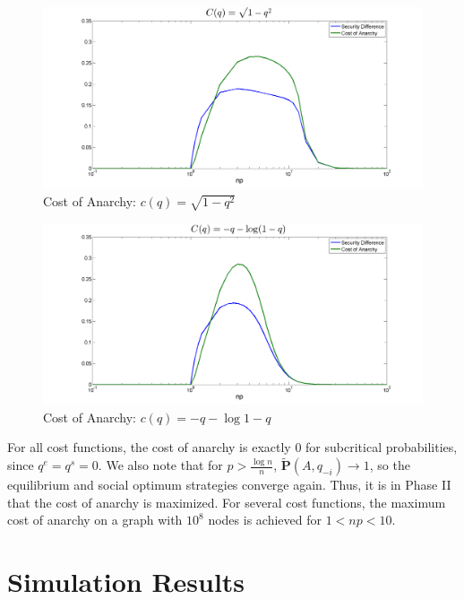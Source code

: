 \documentclass{article}
\theoremstyle{plain}
\begin{document}
\begin{figure}[h!]
  \centering
  \includegraphics[width=6in]{cost_of_anarchy_sqrt(1-q^2).png}
  \caption{Cost of Anarchy: $c(q) = \sqrt{1-q^2}$}
  \label{cost_of_anarchy_sqrt(1-q^2).fig}
\end{figure}

\begin{figure}[h!]
  \centering
  \includegraphics[width=6in]{cost_of_anarchy_-q-log(1-q).png}
  \caption{Cost of Anarchy: $c(q) = -q - \log{1-q}$}
  \label{cost_of_anarchy_-q-log(1-q).fig}
\end{figure}

For all cost functions, the cost of anarchy is exactly $0$ for subcritical probabilities, since $q^e = q^s = 0$. We also note that for $p > \frac{\log{n}}{n}$,  $\tilde{\textbf{P}}(A,q_{-i}) \rightarrow 1$, so the equilibrium and social optimum strategies converge again. Thus, it is in Phase II that the cost of anarchy is maximized. For several cost functions, the maximum cost of anarchy on a graph with $10^8$ nodes is achieved for $1<np<10$.

\section{Simulation Results}
\end{document}
